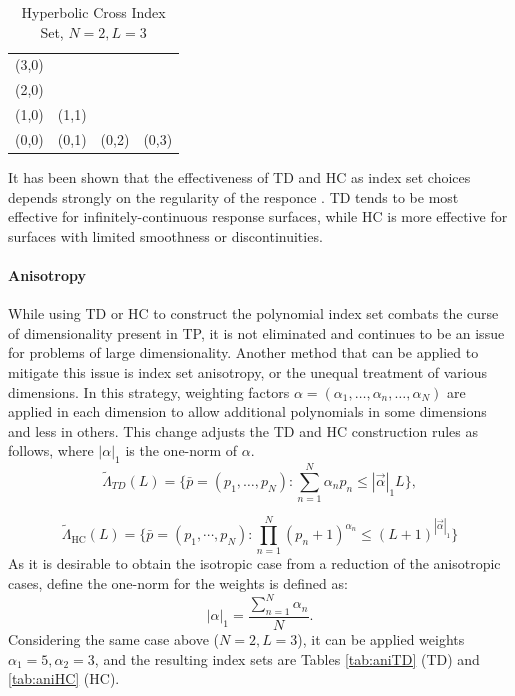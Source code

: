 \begin{table}[h]
  \centering
  \begin{tabular}{c c c c}
    (3,0) &       &       &       \\
    (2,0) &       &       &       \\
    (1,0) & (1,1) &       &       \\
    (0,0) & (0,1) & (0,2) & (0,3)
  \end{tabular}
  \caption{Hyperbolic Cross Index Set, $N=2,L=3$}
  \label{tab:HC}
\end{table}

It has been shown that the effectiveness of TD and HC as index set choices depends strongly on the regularity
of the responce \cite{hctd}.  TD tends to be most effective for infinitely-continuous response surfaces,
while HC is more effective for surfaces with limited smoothness or discontinuities.

\paragraph{Anisotropy}
While using TD or HC to construct the polynomial index set combats the curse of dimensionality present in TP,
it is not eliminated and continues to be an issue for problems of large dimensionality.  Another method that can
be applied to mitigate this issue is index set anisotropy, or the unequal treatment of various dimensions.
In this strategy, weighting factors $\alpha=(\alpha_1,\ldots,\alpha_n,\ldots,\alpha_N)$ are applied in each
dimension to allow additional polynomials in some dimensions and less in others.  This change adjusts the TD
and HC construction rules as follows, where $|\alpha|_1$ is the one-norm of $\alpha$.
\begin{equation}
  \tilde\Lambda_{TD}(L)=\Big\{\bar p=(p_1,\ldots,p_N):\sum_{n=1}^{N} \alpha_n p_{n} \leq |\vec\alpha|_1 L\Big\},
\end{equation}

\begin{equation}
  \tilde\Lambda_\text{HC}(L)=\Big\{\bar p=(p_1,\cdots,p_N):\prod_{n=1}^N (p_n+1)^{\alpha_n} \leq
  (L+1)^{|\vec\alpha|_1} \Big\}
\end{equation}
As it is desirable to obtain the isotropic case from a reduction of the anisotropic cases, define the
one-norm for the weights is defined as:
\begin{equation}
  |\alpha|_1 = \frac{\sum_{n=1}^N \alpha_n}{N}.
\end{equation}
Considering the same case above ($N=2,L=3$), it can be applied weights $\alpha_1=5,\alpha_2=3$, and the resulting index
sets are Tables \ref{tab:aniTD} (TD) and \ref{tab:aniHC} (HC).

